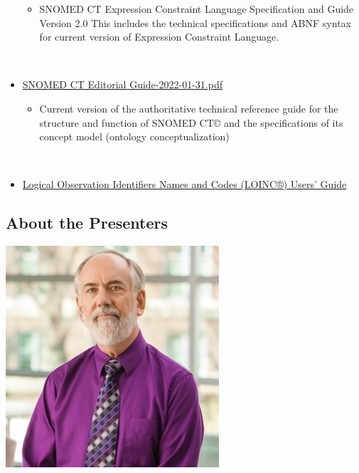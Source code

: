 \documentclass[
]{journal}
\providecommand{\tightlist}{%
  \setlength{\itemsep}{0pt}\setlength{\parskip}{0pt}}
\begin{document}
\begin{itemize}
  \begin{itemize}
  \tightlist
  \item
    SNOMED CT Expression Constraint Language Specification and Guide Version 2.0 This includes the technical specifications and ABNF syntax for current version of Expression Constraint Language.\\
    \strut \\
  \end{itemize}
\item
  \href{https://github.com/UNMC-CRANE/AMIA_Workshop_May_2022/blob/main/Handouts_for_workshop/SNOMED\%20CT\%20Editorial\%20Guide-2022-01-31.pdf}{SNOMED CT Editorial Guide-2022-01-31.pdf}

  \begin{itemize}
  \tightlist
  \item
    Current version of the authoritative technical reference guide for the structure and function of SNOMED CT© and the specifications of its concept model (ontology conceptualization)\\
    \strut \\
  \end{itemize}
\item
  \href{https://github.com/UNMC-CRANE/AMIA_Workshop_May_2022/blob/main/Handouts_for_workshop/LOINCUsersGuide.pdf}{Logical Observation Identifiers Names and Codes (LOINC®) Users' Guide}
\end{itemize}

\hypertarget{about-the-presenters}{%
\subsection{About the Presenters}\label{about-the-presenters}}

\begin{flushleft}\includegraphics[width=0.5\linewidth]{assets/biography/jamescampbell} \end{flushleft}
\end{document}
